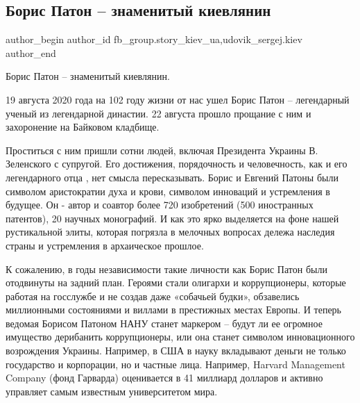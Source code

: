  
 
 
 
 
 
\subsection{Борис Патон – знаменитый киевлянин}
\label{sec:24_08_2020.fb.fb_group.story_kiev_ua.1.boris_paton_kievljanin}
 
\ifcmt
 author_begin
   author_id fb_group.story_kiev_ua,udovik_sergej.kiev
 author_end
\fi

Борис Патон – знаменитый киевлянин.

19 августа 2020 года на 102 году жизни от нас ушел Борис Патон – легендарный
ученый из легендарной династии. 22 августа прошло прощание с ним и захоронение
на Байковом кладбище.


Проститься с ним пришли сотни людей, включая Президента Украины В. Зеленского с
супругой. Его достижения, порядочность и человечность, как и его легендарного
отца , нет смысла пересказывать. Борис и Евгений Патоны были символом
аристократии духа и крови, символом инноваций и устремления в будущее. Он -
автор и соавтор более 720 изобретений (500 иностранных патентов), 20 научных
монографий.  И как это ярко выделяется на фоне нашей рустикальной элиты,
которая погрязла в мелочных вопросах дележа наследия страны и устремления в
архаическое прошлое.


К сожалению, в годы независимости такие личности как Борис Патон были
отодвинуты на задний план. Героями стали олигархи и коррупционеры, которые
работая на госслужбе и не создав даже «собачьей будки», обзавелись миллионными
состояниями и виллами в престижных местах Европы. И теперь ведомая Борисом
Патоном  НАНУ станет маркером – будут ли ее огромное имущество дерибанить
коррупционеры, или она станет символом инновационного возрождения Украины.
Например, в США в науку вкладывают деньги не только государство и корпорации,
но и частные лица. Например, Harvard Management Company (фонд Гарварда)
оценивается в 41 миллиард долларов и активно управляет самым известным
университетом мира.

